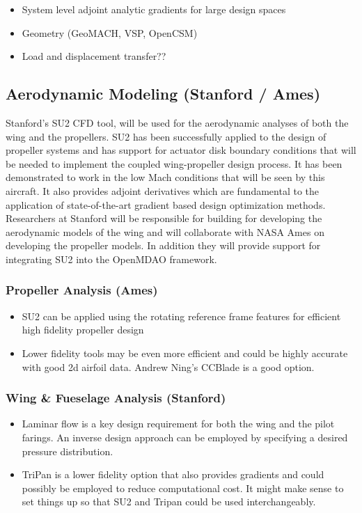 \documentclass[]{aiaa-tc}
\begin{document}
    \begin{itemize}
        \item System level adjoint analytic gradients for large design spaces
        \item Geometry (GeoMACH, VSP, OpenCSM)
        \item Load and displacement transfer?? 
    \end{itemize}

    

    \subsection{Aerodynamic Modeling (Stanford / Ames)}

    Stanford's SU2 CFD tool, will be used for the aerodynamic analyses of both the wing and 
    the propellers. SU2 has been successfully applied to the design of propeller systems 
    and has support for actuator disk boundary conditions that will be needed to implement 
    the coupled wing­-propeller design process. It has been demonstrated to work in the low 
    Mach conditions that will be seen by this aircraft. It also provides adjoint derivatives 
    which are fundamental to the application of state­-of-­the-­art gradient based design 
    optimization methods. Researchers at Stanford will be responsible for building for developing 
    the aerodynamic models of the wing and will collaborate with NASA Ames on developing the 
    propeller models. In addition they will provide support for integrating SU2 into the OpenMDAO 
    framework. 

    \subsubsection{Propeller Analysis (Ames)}
        \begin{itemize}
            \item SU2 can be applied using the rotating reference frame features for efficient high fidelity propeller design
            \item Lower fidelity tools may be even more efficient and could be highly accurate with good 2d airfoil data. Andrew Ning's 
            CCBlade is a good option. 
        \end{itemize}

    \subsubsection{Wing \& Fueselage Analysis (Stanford)}
        \begin{itemize}
            \item Laminar flow is a key design requirement for both the wing and the pilot farings. An inverse design approach can be employed 
            by specifying a desired pressure distribution. 
            \item TriPan is a lower fidelity option that also provides gradients and could possibly be employed to reduce computational cost. It might make sense to set things up so that SU2 and Tripan could be used interchangeably. 
        \end{itemize}
\end{document}
